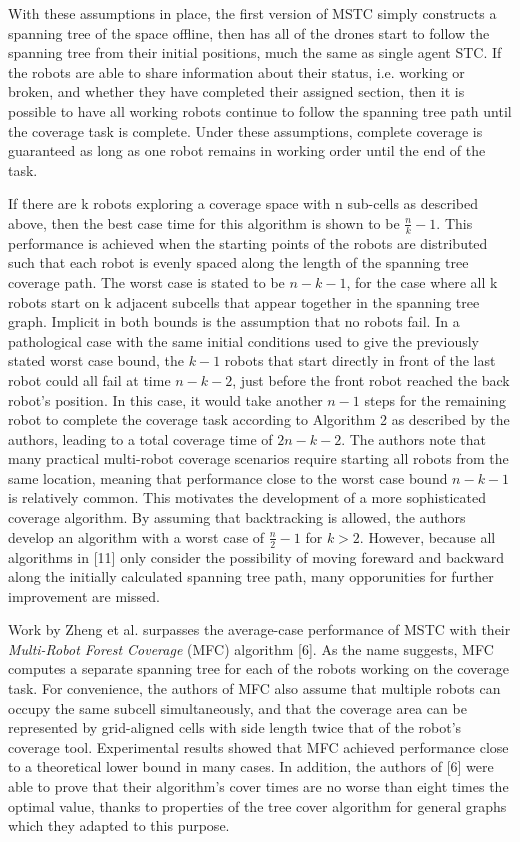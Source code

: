 With these assumptions in place, the first version of MSTC simply constructs a spanning tree of the space offline, then has all of the drones start to follow the spanning tree from their initial positions, much the same as single agent STC. If the robots are able to share information about their status, i.e. working or broken, and whether they have completed their assigned section, then it is possible to have all working robots continue to follow the spanning tree path until the coverage task is complete. Under these assumptions, complete coverage is guaranteed as long as one robot remains in working order until the end of the task.

If there are k robots exploring a coverage space with n sub-cells as described above, then the best case time for this algorithm is shown to be $ \frac{n}{k} - 1 $. This performance is achieved when the starting points of the robots are distributed such that each robot is evenly spaced along the length of the spanning tree coverage path. The worst case is stated to be $ n - k - 1$, for the case where all k robots start on k adjacent subcells that appear together in the spanning tree graph. Implicit in both bounds is the assumption that no robots fail. In a pathological case with the same initial conditions used to give the previously stated worst case bound, the $ k - 1$ robots that start directly in front of the last robot could all fail at time $ n - k - 2$, just before the front robot reached the back robot's position. In this case, it would take another $n - 1$  steps for the remaining robot to complete the coverage task according to Algorithm 2 as described by the authors, leading to a total coverage time of $ 2 n - k - 2 $. The authors note that many practical multi-robot coverage scenarios require starting all robots from the same location, meaning that performance close to the worst case bound $ n - k - 1 $ is relatively common. This motivates the development of a more sophisticated coverage algorithm. By assuming that backtracking is allowed, the authors develop an algorithm with a worst case of $ \frac{n}{2} - 1 $ for $ k > 2 $. However, because all algorithms in [11] only consider the possibility of moving foreward and backward along the initially calculated spanning tree path, many opporunities for further improvement are missed.

Work by Zheng et al. surpasses the average-case performance of MSTC with their \textit{Multi-Robot Forest Coverage} (MFC) algorithm [6]. As the name suggests, MFC computes a separate spanning tree for each of the robots working on the coverage task. For convenience, the authors of MFC also assume that multiple robots can occupy the same subcell simultaneously, and that the coverage area can be represented by grid-aligned cells with side length twice that of the robot's coverage tool. Experimental results showed that MFC achieved performance close to a theoretical lower bound in many cases. In addition, the authors of [6] were able to prove that their algorithm's cover times are no worse than eight times the optimal value, thanks to properties of the tree cover algorithm for general graphs which they adapted to this purpose.

